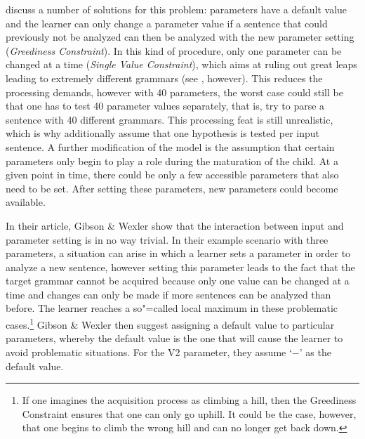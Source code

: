 \largerpage[2]
\citet{GW94a} discuss a number of solutions for this problem: parameters have a default value
and the learner can only change a parameter value if a sentence that could previously not be analyzed
can then be analyzed with the new parameter setting (\emph{Greediness Constraint}).
In this kind of procedure, only one parameter can be changed at a time
(\emph{Single Value Constraint}),
which aims at ruling out great leaps leading to extremely different grammars (see \citealp[--613]{BN96a}, however).
This reduces the processing demands, however with 40 parameters, the worst case could still be that
one has to test 40 parameter values separately, that is, try to parse a sentence with 40 different
grammars. This processing feat is still unrealistic, which is why \citet[]{GW94a} additionally
assume that one hypothesis is tested per input sentence.
A further modification of the model is the assumption that certain parameters only begin to play a role
during the maturation of the child. At a given point in time, there could be only a few accessible parameters
that also need to be set. After setting these parameters, new parameters could become available.

In their article, Gibson \& Wexler show that the interaction between input and parameter setting is in no way trivial.
In their example scenario with three parameters, a situation can arise in which a learner sets a parameter in order to analyze
a new sentence, however setting this parameter leads to the fact that the target grammar cannot be acquired because only one value can
be changed at a time and changes can only be made if more sentences can be analyzed than before. The learner reaches a so"=called
local maximum in these problematic cases.\footnote{%
	If one imagines the acquisition process as climbing a hill, then the Greediness Constraint ensures
	that one can only go uphill. It could be the case, however, that one begins to climb the wrong hill and can no longer get back down.}
Gibson \& Wexler then suggest assigning a default value to particular parameters, whereby the default value is the one that will cause the learner
to avoid problematic situations. For the V2 parameter, they assume `$-$' as the default value.


